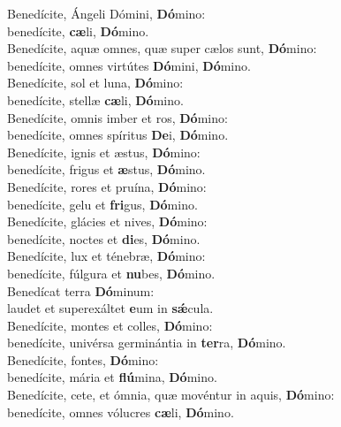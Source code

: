 \evenverse Benedícite, Ángeli Dómini, \textbf{Dó}mino:~\*\\
\evenverse benedícite, \textbf{cæ}li, \textbf{Dó}mino.\\
\oddverse Benedícite, aquæ omnes, quæ super cælos sunt, \textbf{Dó}mino:~\*\\
\oddverse benedícite, omnes virtútes \textbf{Dó}mini, \textbf{Dó}mino.\\
\evenverse Benedícite, sol et luna, \textbf{Dó}mino:~\*\\
\evenverse benedícite, stellæ \textbf{cæ}li, \textbf{Dó}mino.\\
\oddverse Benedícite, omnis imber et ros, \textbf{Dó}mino:~\*\\
\oddverse benedícite, omnes spíritus \textbf{De}i, \textbf{Dó}mino.\\
\evenverse Benedícite, ignis et æstus, \textbf{Dó}mino:~\*\\
\evenverse benedícite, frigus et \textbf{æ}stus, \textbf{Dó}mino.\\
\oddverse Benedícite, rores et pruína, \textbf{Dó}mino:~\*\\
\oddverse benedícite, gelu et \textbf{fri}gus, \textbf{Dó}mino.\\
\evenverse Benedícite, glácies et nives, \textbf{Dó}mino:~\*\\
\evenverse benedícite, noctes et \textbf{di}es, \textbf{Dó}mino.\\
\oddverse Benedícite, lux et ténebræ, \textbf{Dó}mino:~\*\\
\oddverse benedícite, fúlgura et \textbf{nu}bes, \textbf{Dó}mino.\\
\evenverse Benedícat terra \textbf{Dó}minum:~\*\\
\evenverse laudet et superexáltet \textbf{e}um in \textbf{sǽ}cula.\\
\oddverse Benedícite, montes et colles, \textbf{Dó}mino:~\*\\
\oddverse benedícite, univérsa germinántia in \textbf{ter}ra, \textbf{Dó}mino.\\
\evenverse Benedícite, fontes, \textbf{Dó}mino:~\*\\
\evenverse benedícite, mária et \textbf{flú}mina, \textbf{Dó}mino.\\
\oddverse Benedícite, cete, et ómnia, quæ movéntur in aquis, \textbf{Dó}mino:~\*\\
\oddverse benedícite, omnes vólucres \textbf{cæ}li, \textbf{Dó}mino.\\

